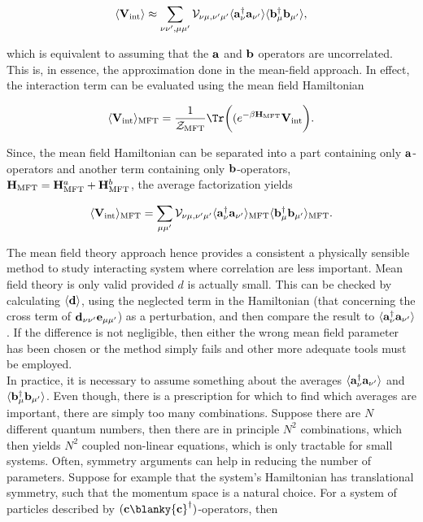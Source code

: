 $$
    \langle {\bf V}_{\textnormal{int}} \rangle \approx \sum_{\nu \nu', \mu \mu'} {\mathcal{V}}_{\nu\mu, \nu'\mu'} \langle {\bf a}_{\nu}^\dagger {\bf a}_{\nu'} \rangle \langle {\bf b}_{\mu}^\dagger {\bf b}_{\mu'} \rangle,
$$

which is equivalent to assuming that the ${\bf a}$ and ${\bf b}$ operators are uncorrelated. This is, in essence, the approximation done in the mean-field approach. In effect, the interaction term can be evaluated using the mean field Hamiltonian 

$$
    \langle {\bf V}_{\textnormal{int}} \rangle_{\textnormal{MFT}} = \frac{1}{\mathcal{Z}_{\textnormal{MFT}}} \Tr \bigg((e^{-\beta {\bf H}_{\textnormal{MFT}}} {\bf V}_{\textnormal{int}}\bigg). 
$$

Since, the mean field Hamiltonian can be separated into a part containing only ${\bf a}$-operators and another term containing only ${\bf b}$-operators, ${\bf H}_{\textnormal{MFT}} = {\bf H}_{\textnormal{MFT}}^a + {\bf H}_{\textnormal{MFT}}^b$, the average factorization yields

\begin{equation}
    \langle {\bf V}_{\textnormal{int}} \rangle_{\textnormal{MFT}} = \sum_{\mu\mu'} {\mathcal{V}}_{\nu\mu, \nu'\mu'} \langle {\bf a}_{\nu}^\dagger {\bf a}_{\nu'} \rangle_{\textnormal{MFT}} \langle {\bf b}_{\mu}^\dagger {\bf b}_{\mu'} \rangle _{\textnormal{MFT}}.
\end{equation}

The mean field theory approach hence provides a consistent a physically sensible method to study interacting system where correlation are less important. Mean field theory is only valid provided $d$ is actually small. This can be checked by calculating $\langle {\bf d} \rangle$, using the neglected term in the Hamiltonian (that concerning the cross term of ${{\bf d}_{\nu \nu'} {\bf e}_{\mu\mu'}}$) as a perturbation, and then compare the result to $\langle {\bf a}_{\nu}^\dagger {\bf a}_{\nu'} \rangle$. If the difference is not negligible, then either the wrong mean field parameter has been chosen or the method simply fails and other more adequate tools must be employed. \\

In practice, it is necessary to assume something about the averages $\langle {\bf a}_{\nu}^\dagger {\bf a}_{\nu'}\rangle$ and $\langle {\bf b}_{\mu}^\dagger {\bf b}_{\mu'} \rangle$. Even though, there is a prescription for which to find which averages are important, there are simply too many combinations. Suppose there are $N$ different quantum numbers, then there are in principle $N^2$ combinations, which then yields $N^2$ coupled non-linear equations, which is only tractable for small systems. Often, symmetry arguments can help in reducing the number of parameters. Suppose for example that the system's Hamiltonian has translational symmetry, such that the momentum space is a natural choice. For a system of particles described by $({\bf c} \blanky {\bf c}^\dagger)$-operators, then 


